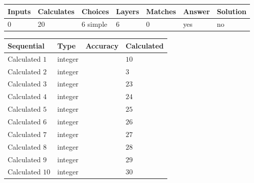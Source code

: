 \documentclass[12pt]{article}
\begin{document}
 
   
   
   
   
\noindent\begin{tabular}{|l|l|l|l|l|l|l|}
 \hline
Inputs & Calculates & Choices & Layers & Matches & Answer & Solution \\ \hline
           0  & 
          20  & 
           6
  simple  
  & 
           6  & 
           0  & 
  yes & 
  no 
  \\ \hline
 \end{tabular}
   
   
   
   
\noindent{}
   
   
  
  
\noindent\begin{tabular}{|l|l|l|l|}
\hline
 Sequential & Type & Accuracy & Calculated \\ 
\hline
 
 
  Calculated $            1 $ & integer &  & 
  $ 10 $ 
 \\  \hline  
 
 
  Calculated $            2 $ & integer &  & 
  $ 3 $ 
 \\  \hline  
 
 
  Calculated $            3 $ & integer &  & 
  $ 23 $ 
 \\  \hline  
 
 
  Calculated $            4 $ & integer &  & 
  $ 24 $ 
 \\  \hline  
 
 
  Calculated $            5 $ & integer &  & 
  $ 25 $ 
 \\  \hline  
 
 
  Calculated $            6 $ & integer &  & 
  $ 26 $ 
 \\  \hline  
 
 
  Calculated $            7 $ & integer &  & 
  $ 27 $ 
 \\  \hline  
 
 
  Calculated $            8 $ & integer &  & 
  $ 28 $ 
 \\  \hline  
 
 
  Calculated $            9 $ & integer &  & 
  $ 29 $ 
 \\  \hline  
 
 
  Calculated $           10 $ & integer &  & 
  $ 30 $ 
 \\  \hline  
 \end{tabular}
   
\end{document}
